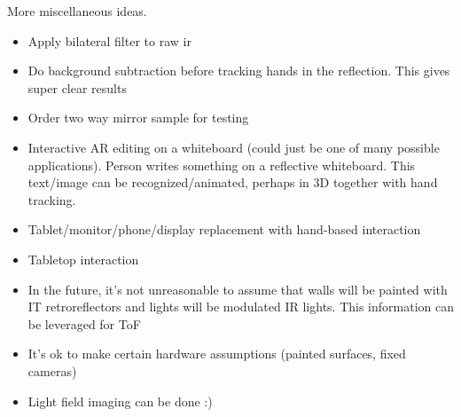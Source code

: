 More miscellaneous ideas.

\begin{itemize}
\item Apply bilateral filter to raw ir
\item Do background subtraction before tracking hands in the reflection. This gives super clear results
\item Order two way mirror sample for testing
\item Interactive AR editing on a whiteboard (could just be one of many possible applications). Person writes something on a reflective whiteboard. This text/image can be recognized/animated, perhaps in 3D together with hand tracking.\item Tablet/monitor/phone/display replacement with hand-based interaction
\item Tabletop interaction
\item In the future, it's not unreasonable to assume that walls will be painted with IT retroreflectors and lights will be modulated IR lights. This information can be leveraged for ToF
\item It's ok to make certain hardware assumptions (painted surfaces, fixed cameras)
\item Light field imaging can be done :)
\end{itemize}